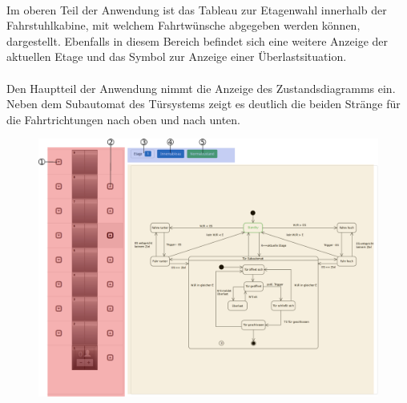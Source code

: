 \paragraph{}Im oberen Teil der Anwendung  ist das Tableau zur Etagenwahl innerhalb der Fahrstuhlkabine, mit welchem Fahrtwünsche abgegeben werden können, dargestellt. Ebenfalls in diesem Bereich befindet sich eine weitere Anzeige der aktuellen Etage und das Symbol zur Anzeige einer Überlastsituation.

\paragraph{}Den Hauptteil der Anwendung  nimmt die Anzeige des Zustandsdiagramms ein. Neben dem Subautomat des Türsystems zeigt es deutlich die beiden Stränge für die Fahrtrichtungen nach oben und nach unten.

\newpage

\begin{figure}[h!]
	\hspace*{-1.5cm}
	\vspace*{-2.5cm}
	\includegraphics[width=1.2\textwidth]{images/UI.eps}
\end{figure}

